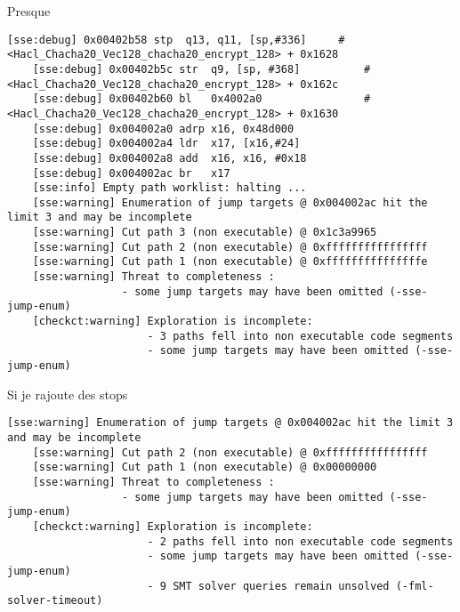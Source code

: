 \documentclass[A4,svgnames,9pt,aspectratio=169]{beamer}
\begin{document}

\begin{frame}[fragile]{Presque}
  \begin{lstlisting}[basicstyle=\scriptsize, caption={binsec -sse -sse-depth 1000000 -sse-script study.ini -checkct chacha20poly1305-128-binsec-test.exe}, gobble=4, frame=single, captionpos=b]
    [sse:debug] 0x00402b58 stp	q13, q11, [sp,#336]  	# <Hacl_Chacha20_Vec128_chacha20_encrypt_128> + 0x1628
    [sse:debug] 0x00402b5c str	q9, [sp, #368]       	# <Hacl_Chacha20_Vec128_chacha20_encrypt_128> + 0x162c
    [sse:debug] 0x00402b60 bl	0x4002a0              	# <Hacl_Chacha20_Vec128_chacha20_encrypt_128> + 0x1630
    [sse:debug] 0x004002a0 adrp	x16, 0x48d000       
    [sse:debug] 0x004002a4 ldr	x17, [x16,#24]       
    [sse:debug] 0x004002a8 add	x16, x16, #0x18      
    [sse:debug] 0x004002ac br	x17                   
    [sse:info] Empty path worklist: halting ...
    [sse:warning] Enumeration of jump targets @ 0x004002ac hit the limit 3 and may be incomplete
    [sse:warning] Cut path 3 (non executable) @ 0x1c3a9965
    [sse:warning] Cut path 2 (non executable) @ 0xffffffffffffffff
    [sse:warning] Cut path 1 (non executable) @ 0xfffffffffffffffe
    [sse:warning] Threat to completeness :
                  - some jump targets may have been omitted (-sse-jump-enum)
    [checkct:warning] Exploration is incomplete:
                      - 3 paths fell into non executable code segments
                      - some jump targets may have been omitted (-sse-jump-enum)
  \end{lstlisting}
\end{frame}

\begin{frame}[fragile]{Si je rajoute des stops}
  \begin{lstlisting}[basicstyle=\scriptsize, caption={binsec -sse -sse-depth 1000000 -sse-script study.ini -checkct chacha20poly1305-128-binsec-test.exe}, gobble=4, frame=single, captionpos=b]
    [sse:warning] Enumeration of jump targets @ 0x004002ac hit the limit 3 and may be incomplete
    [sse:warning] Cut path 2 (non executable) @ 0xffffffffffffffff
    [sse:warning] Cut path 1 (non executable) @ 0x00000000
    [sse:warning] Threat to completeness :
                  - some jump targets may have been omitted (-sse-jump-enum)
    [checkct:warning] Exploration is incomplete:
                      - 2 paths fell into non executable code segments
                      - some jump targets may have been omitted (-sse-jump-enum)
                      - 9 SMT solver queries remain unsolved (-fml-solver-timeout)
  \end{lstlisting}
\end{frame}
\end{document}
